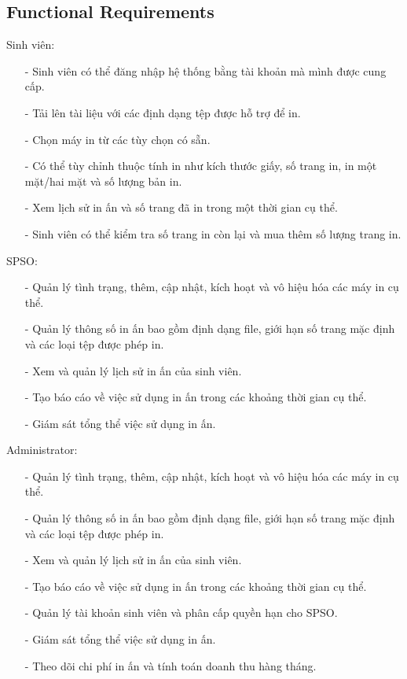 \subsection{Functional Requirements}
Sinh viên:
\begin{itemize}
	\item[-] Sinh viên có thể đăng nhập hệ thống bằng tài khoản mà mình được cung cấp.
	\item[-] Tải lên tài liệu với các định dạng tệp được hỗ trợ để in.
	\item[-] Chọn máy in từ các tùy chọn có sẵn.
	\item[-] Có thể tùy chỉnh thuộc tính in như kích thước giấy, số trang in, in một mặt/hai mặt và số lượng bản in.
	\item[-] Xem lịch sử in ấn và số trang đã in trong một thời gian cụ thể.
	\item[-] Sinh viên có thể kiểm tra số trang in còn lại và mua thêm số lượng trang in.
\end{itemize}

SPSO:
\begin{itemize}
	\item[-] Quản lý tình trạng, thêm, cập nhật, kích hoạt và vô hiệu hóa các máy in cụ thể.
	\item[-] Quản lý thông số in ấn bao gồm định dạng file, giới hạn số trang mặc định và các loại tệp được phép in.
	\item[-] Xem và quản lý lịch sử in ấn của sinh viên.
	\item[-] Tạo báo cáo về việc sử dụng in ấn trong các khoảng thời gian cụ thể.
	\item[-] Giám sát tổng thể việc sử dụng in ấn.
\end{itemize}

Administrator:
\begin{itemize}
	\item[-] Quản lý tình trạng, thêm, cập nhật, kích hoạt và vô hiệu hóa các máy in cụ thể.
	\item[-] Quản lý thông số in ấn bao gồm định dạng file, giới hạn số trang mặc định và các loại tệp được phép in.
	\item[-] Xem và quản lý lịch sử in ấn của sinh viên.
	\item[-] Tạo báo cáo về việc sử dụng in ấn trong các khoảng thời gian cụ thể.
	\item[-] Quản lý tài khoản sinh viên và phân cấp quyền hạn cho SPSO.
	\item[-] Giám sát tổng thể việc sử dụng in ấn.
	\item[-] Theo dõi chi phí in ấn và tính toán doanh thu hàng tháng.
\end{itemize}


